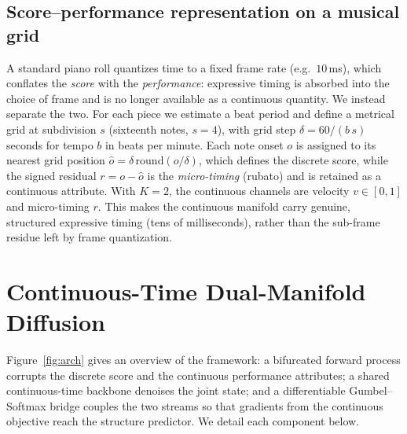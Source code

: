 \documentclass[review]{elsarticle}
\begin{document}
\subsection{Score--performance representation on a musical grid}
\label{sec:representation}
A standard piano roll quantizes time to a fixed frame rate (e.g.\ $10$\,ms), which
conflates the \emph{score} with the \emph{performance}: expressive timing is absorbed into
the choice of frame and is no longer available as a continuous quantity. We instead
separate the two. For each piece we estimate a beat period and define a metrical grid at
subdivision $s$ (sixteenth notes, $s=4$), with grid step $\delta = 60/(b\,s)$ seconds for
tempo $b$ in beats per minute. Each note onset $o$ is assigned to its nearest grid position
$\hat{o}=\delta\,\mathrm{round}(o/\delta)$, which defines the discrete score, while the
signed residual $r=o-\hat{o}$ is the \emph{micro-timing} (rubato) and is retained as a
continuous attribute. With $K=2$, the continuous channels are velocity $v\in[0,1]$ and
micro-timing $r$. This makes the continuous manifold carry genuine, structured expressive
timing (tens of milliseconds), rather than the sub-frame residue left by frame
quantization.

\section{Continuous-Time Dual-Manifold Diffusion}
\label{sec:method}

Figure~\ref{fig:arch} gives an overview of the framework: a bifurcated forward process
corrupts the discrete score and the continuous performance attributes; a shared
continuous-time backbone denoises the joint state; and a differentiable Gumbel--Softmax
bridge couples the two streams so that gradients from the continuous objective reach the
structure predictor. We detail each component below.
\end{document}
